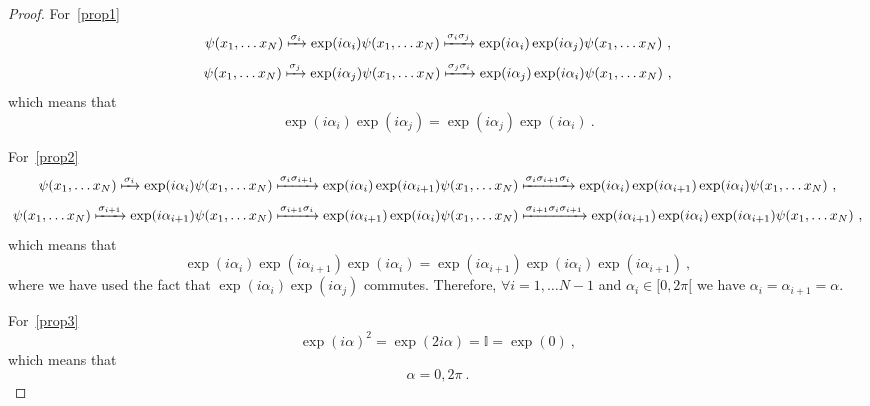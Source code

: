     \begin{proof}
        For~\eqref{prop1}
        \begin{equation*}
            \psi(x_1, \ldots x_N) \xmapsto{\sigma_i} \exp(i \alpha_i) \psi(x_1, \ldots x_N)\xmapsto{\sigma_i \sigma_j} \exp(i \alpha_i) \exp(i \alpha_j) \psi(x_1, \ldots x_N) ~,
        \end{equation*}
        \begin{equation*}
            \psi(x_1, \ldots x_N) \xmapsto{\sigma_j} \exp(i \alpha_j) \psi(x_1, \ldots x_N)\xmapsto{\sigma_j \sigma_i} \exp(i \alpha_j) \exp(i \alpha_i) \psi(x_1, \ldots x_N) ~,
        \end{equation*}
        which means that 
        \begin{equation*}
            \exp(i \alpha_i) \exp(i \alpha_j) = \exp(i \alpha_j) \exp(i \alpha_i) ~.
        \end{equation*}

        For~\eqref{prop2}
        \begin{equation*}
            \psi(x_1, \ldots x_N) \xmapsto{\sigma_i} \exp(i \alpha_i) \psi(x_1, \ldots x_N)\xmapsto{\sigma_i \sigma_{i+1}} \exp(i \alpha_i) \exp(i \alpha_{i+1}) \psi(x_1, \ldots x_N) \xmapsto{\sigma_i \sigma_{i+1} \sigma_i} \exp(i \alpha_i) \exp(i \alpha_{i+1}) \exp(i \alpha_i) \psi(x_1, \ldots x_N) ~,
        \end{equation*}
        \begin{equation*}
            \psi(x_1, \ldots x_N) \xmapsto{\sigma_{i+1}} \exp(i \alpha_{i+1}) \psi(x_1, \ldots x_N)\xmapsto{\sigma_{i+1} \sigma_i} \exp(i \alpha_{i+1}) \exp(i \alpha_i) \psi(x_1, \ldots x_N) \xmapsto{\sigma_{i+1} \sigma_i \sigma_{i+1} } \exp(i \alpha_{i+1}) \exp(i \alpha_i) \exp(i \alpha_{i+1}) \psi(x_1, \ldots x_N) ~,
        \end{equation*}
        which means that 
        \begin{equation*}
            \exp(i \alpha_i) \exp(i \alpha_{i+1}) \exp(i \alpha_i) = \exp(i \alpha_{i+1}) \exp(i \alpha_i) \exp(i \alpha_{i+1}) ~,
        \end{equation*}
        where we have used the fact that $\exp(i \alpha_i) \exp(i \alpha_j)$ commutes. Therefore, $\forall i= 1, \ldots N-1$ and $\alpha_i \in [0, 2\pi[$ we have $\alpha_i = \alpha_{i+1} = \alpha$.

        For~\eqref{prop3}
        \begin{equation*}
            \exp(i \alpha)^2 = \exp (2 i \alpha) = \mathbb I = \exp(0) ~,
        \end{equation*}
        which means that 
        \begin{equation*}
            \alpha = 0, 2\pi ~.
        \end{equation*}


\end{proof}
